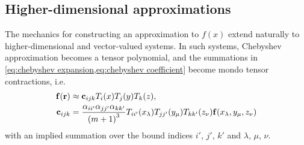 \subsection{Higher-dimensional approximations}
The mechanics for constructing an approximation to $f(x)$ extend naturally to higher-dimensional and vector-valued systems.
In such systems, Chebyshev approximation becomes a tensor polynomial,
and the summations in \cref{eq:chebyshev expansion,eq:chebyshev coefficient} become mondo tensor contractions, i.e.
\begin{subequations}
  \begin{align}
    \vb{f}(\vb{r}) &\approx \vb{c}_{ijk} T_i(x) T_j(y) T_k(z), \\
    \vb{c}_{ijk} &= \frac{\alpha_{ii'} \alpha_{jj'} \alpha_{kk'}}{\qty(m+1)^3} T_{ii'}(x_\lambda) T_{jj'}(y_\mu) T_{kk'}(z_\nu) \vb{f}(x_\lambda, y_\mu, z_\nu)
  \end{align}
\end{subequations}
with an implied summation over the bound indices $i'$, $j'$, $k'$ and $\lambda$, $\mu$, $\nu$.
